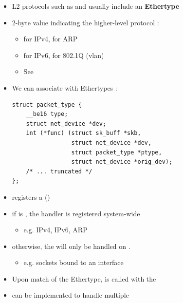 \begin{frame}[fragile]{}
	\begin{itemize}
		\item L2 protocols such as  and  usually include an \textbf{Ethertype}
		\item 2-byte value indicating the higher-level protocol :
			\begin{itemize}
				\item {} for IPv4,  for ARP
				\item {} for IPv6,  for 802.1Q (vlan)
				\item See 
			\end{itemize}
		\item We can associate  with Ethertypes : \\
			\begin{verbatim}
struct packet_type {
    __be16 type;
    struct net_device *dev;
    int (*func) (struct sk_buff *skb,
                 struct net_device *dev,
                 struct packet_type *ptype,
                 struct net_device *orig_dev);
    /* ... truncated */
};
			\end{verbatim}
	\end{itemize}
\end{frame}

\begin{frame}[fragile]{}
	\begin{itemize}
		\item {} registers a  ()
		\item if  is , the handler is registered system-wide
			\begin{itemize}
				\item e.g. IPv4, IPv6, ARP
			\end{itemize}
		\item otherwise, the  will only be handled on .
			\begin{itemize}
				\item e.g.  sockets bound to an interface
			\end{itemize}
		\item Upon match of the Ethertype,  is called with the 
		\item {} can be implemented to handle multiple 
	\end{itemize}
\end{frame}

